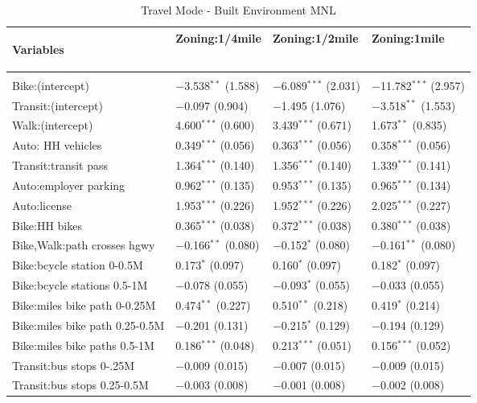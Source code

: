 \begin{longtabu}{llll}
	\caption{Travel Mode - Built Environment MNL} \\
	\label{model2} 
	
	Variables															   & Zoning:1/4mile						& Zoning:1/2mile & Zoning:1mile  \\ \hline	
	&								&			&					\\		   
	\endhead
  Bike:(intercept) & $-$3.538$^{**}$ (1.588) & $-$6.089$^{***}$ (2.031) & $-$11.782$^{***}$ (2.957) \\ 
  Transit:(intercept) & $-$0.097 (0.904) & $-$1.495 (1.076) & $-$3.518$^{**}$ (1.553) \\ 
  Walk:(intercept) & 4.600$^{***}$ (0.600) & 3.439$^{***}$ (0.671) & 1.673$^{**}$ (0.835) \\ 
  Auto: HH vehicles & 0.349$^{***}$ (0.056) & 0.363$^{***}$ (0.056) & 0.358$^{***}$ (0.056) \\ 
  Transit:transit pass & 1.364$^{***}$ (0.140) & 1.356$^{***}$ (0.140) & 1.339$^{***}$ (0.141) \\ 
  Auto:employer parking & 0.962$^{***}$ (0.135) & 0.953$^{***}$ (0.135) & 0.965$^{***}$ (0.134) \\ 
  Auto:license & 1.953$^{***}$ (0.226) & 1.952$^{***}$ (0.226) & 2.025$^{***}$ (0.227) \\ 
  Bike:HH bikes & 0.365$^{***}$ (0.038) & 0.372$^{***}$ (0.038) & 0.380$^{***}$ (0.038) \\ 
  Bike,Walk:path crosses hgwy & $-$0.166$^{**}$ (0.080) & $-$0.152$^{*}$ (0.080) & $-$0.161$^{**}$ (0.080) \\ 
  Bike:bcycle station 0-0.5M & 0.173$^{*}$ (0.097) & 0.160$^{*}$ (0.097) & 0.182$^{*}$ (0.097) \\ 
  Bike:bcycle stations 0.5-1M & $-$0.078 (0.055) & $-$0.093$^{*}$ (0.055) & $-$0.033 (0.055) \\ 
  Bike:miles bike path 0-0.25M & 0.474$^{**}$ (0.227) & 0.510$^{**}$ (0.218) & 0.419$^{*}$ (0.214) \\ 
  Bike:miles bike path 0.25-0.5M & $-$0.201 (0.131) & $-$0.215$^{*}$ (0.129) & $-$0.194 (0.129) \\ 
  Bike:miles bike paths 0.5-1M & 0.186$^{***}$ (0.048) & 0.213$^{***}$ (0.051) & 0.156$^{***}$ (0.052) \\ 
  Transit:bus stops 0-.25M & $-$0.009 (0.015) & $-$0.007 (0.015) & $-$0.009 (0.015) \\ 
  Transit:bus stops 0.25-0.5M & $-$0.003 (0.008) & $-$0.001 (0.008) & $-$0.002 (0.008) \\ 

\end{longtabu}
